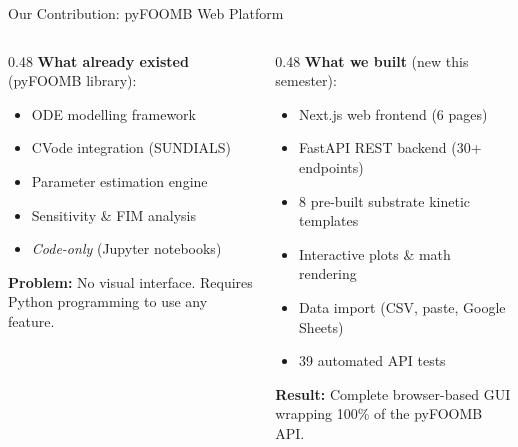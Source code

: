 \documentclass[aspectratio=169, 11pt]{beamer}
\begin{document}
\begin{frame}{Our Contribution: pyFOOMB Web Platform}
  \begin{columns}[T]
    \begin{column}{0.48\textwidth}
      \textbf{What already existed} {\small(pyFOOMB library):}
      \begin{itemize}
        \item[\textcolor{accentblue}{$\bullet$}] ODE modelling framework
        \item[\textcolor{accentblue}{$\bullet$}] CVode integration (SUNDIALS)
        \item[\textcolor{accentblue}{$\bullet$}] Parameter estimation engine
        \item[\textcolor{accentblue}{$\bullet$}] Sensitivity \& FIM analysis
        \item[\textcolor{accentblue}{$\bullet$}] \textit{Code-only} (Jupyter notebooks)
      \end{itemize}

      \vspace{0.2cm}
      \textbf{Problem:} No visual interface. Requires
      Python programming to use any feature.
    \end{column}
    \begin{column}{0.48\textwidth}
      \textbf{What we built} {\small(new this semester):}
      \begin{itemize}
        \item[\textcolor{donegreen}{\checkmark}] Next.js web frontend (6 pages)
        \item[\textcolor{donegreen}{\checkmark}] FastAPI REST backend (30+ endpoints)
        \item[\textcolor{donegreen}{\checkmark}] 8 pre-built substrate kinetic templates
        \item[\textcolor{donegreen}{\checkmark}] Interactive plots \& math rendering
        \item[\textcolor{donegreen}{\checkmark}] Data import (CSV, paste, Google Sheets)
        \item[\textcolor{donegreen}{\checkmark}] 39 automated API tests
      \end{itemize}

      \vspace{0.2cm}
      \textbf{Result:} Complete browser-based GUI
      wrapping 100\% of the pyFOOMB API.
    \end{column}
  \end{columns}
\end{frame}
\end{document}
